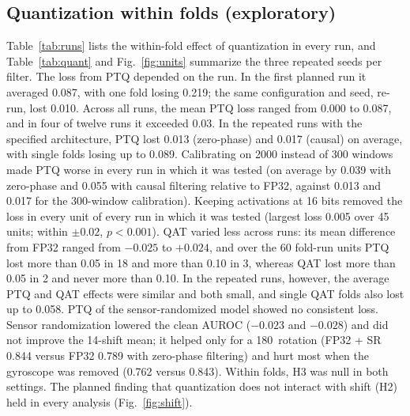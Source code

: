 \documentclass[preprint,12pt]{elsarticle}
\begin{document}
\subsection{Quantization within folds (exploratory)}
Table~\ref{tab:runs} lists the within-fold effect of quantization in every run, and Table~\ref{tab:quant} and Fig.~\ref{fig:units} summarize the three repeated seeds per filter. The loss from PTQ depended on the run. In the first planned run it averaged 0.087, with one fold losing 0.219; the same configuration and seed, re-run, lost 0.010. Across all runs, the mean PTQ loss ranged from 0.000 to 0.087, and in four of twelve runs it exceeded 0.03. In the repeated runs with the specified architecture, PTQ lost 0.013 (zero-phase) and 0.017 (causal) on average, with single folds losing up to 0.089. Calibrating on 2000 instead of 300 windows made PTQ worse in every run in which it was tested (on average by 0.039 with zero-phase and 0.055 with causal filtering relative to FP32, against 0.013 and 0.017 for the 300-window calibration). Keeping activations at 16 bits removed the loss in every unit of every run in which it was tested (largest loss 0.005 over 45 units; within $\pm0.02$, $p<0.001$). QAT varied less across runs: its mean difference from FP32 ranged from $-0.025$ to $+0.024$, and over the 60 fold-run units PTQ lost more than 0.05 in 18 and more than 0.10 in 3, whereas QAT lost more than 0.05 in 2 and never more than 0.10. In the repeated runs, however, the average PTQ and QAT effects were similar and both small, and single QAT folds also lost up to 0.058. PTQ of the sensor-randomized model showed no consistent loss. Sensor randomization lowered the clean AUROC ($-0.023$ and $-0.028$) and did not improve the 14-shift mean; it helped only for a 180\textdegree\ rotation (FP32 + SR 0.844 versus FP32 0.789 with zero-phase filtering) and hurt most when the gyroscope was removed (0.762 versus 0.843). Within folds, H3 was null in both settings. The planned finding that quantization does not interact with shift (H2) held in every analysis (Fig.~\ref{fig:shift}).
\end{document}
